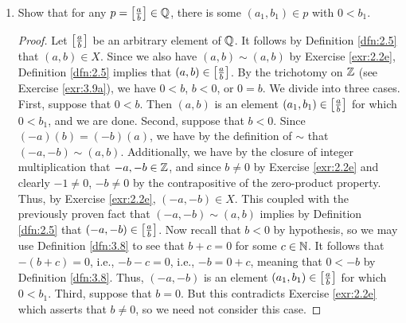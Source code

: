 \documentclass[../main.tex]{subfiles}
\begin{document}
\begin{exercise}
\begin{enumerate}[label={\alph*)},ref={\thetheorem\alph*}]
\begin{proof}
            To prove that $<$ is transitive, it will suffice to show that for all $x,y,z\in\Z$, if $x<y$ and $y<z$, then $x<z$. Let $x,y,z$ be arbitrary elements of $\Z$ for which it is true that $x<y$ and $y<z$. By Definition \ref{dfn:3.8}, we have $y=x+c$ and $z=y+c'$ for some $c,c'\in\N$. Substituting, we have $z=x+c+c'$. Since $(c+c')\in\N$ by the closure of addition on $\N$, Definition \ref{dfn:3.8} implies that $x<z$.\par\medskip
            Axiom \ref{axm:3.3} asserts that $\Z$ must have no first or last point. Suppose for the sake of contradiction that $\Z$ has some first point $a$. Then by Definition \ref{dfn:3.3}, $a\leq x$ for every $x\in\Z$. However, under the closure of subtraction on $\Z$, $(a-1)\in\Z$. Since $(a-1)+1=a$, Definition \ref{dfn:3.8} asserts that $a-1<a$, a contradiction. The proof is symmetric for the last point.
        \end{proof}
        \item \label{exr:3.9b}Show that for any $p=\left[ \frac{a}{b} \right]\in\mathbb{Q}$, there is some $(a_1,b_1)\in p$ with $0<b_1$.
        \begin{proof}
            Let $\left[ \frac{a}{b} \right]$ be an arbitrary element of $\mathbb{Q}$. It follows by Definition \ref{dfn:2.5} that $(a,b)\in X$. Since we also have $(a,b)\sim(a,b)$ by Exercise \ref{exr:2.2e}, Definition \ref{dfn:2.5} implies that $(a,b)\in\left[ \frac{a}{b} \right]$. By the trichotomy on $\Z$ (see Exercise \ref{exr:3.9a}), we have $0<b$, $b<0$, or $0=b$. We divide into three cases. First, suppose that $0<b$. Then $(a,b)$ is an element $(a_1,b_1)\in\left[ \frac{a}{b} \right]$ for which $0<b_1$, and we are done. Second, suppose that $b<0$. Since $(-a)(b)=(-b)(a)$, we have by the definition of $\sim$ that $(-a,-b)\sim(a,b)$. Additionally, we have by the closure of integer multiplication that $-a,-b\in\mathbb{Z}$, and since $b\neq 0$ by Exercise \ref{exr:2.2e} and clearly $-1\neq 0$, $-b\neq 0$ by the contrapositive of the zero-product property. Thus, by Exercise \ref{exr:2.2e}, $(-a,-b)\in X$. This coupled with the previously proven fact that $(-a,-b)\sim(a,b)$ implies by Definition \ref{dfn:2.5} that $(-a,-b)\in\left[ \frac{a}{b} \right]$. Now recall that $b<0$ by hypothesis, so we may use Definition \ref{dfn:3.8} to see that $b+c=0$ for some $c\in\mathbb{N}$. It follows that $-(b+c)=0$, i.e., $-b-c=0$, i.e., $-b=0+c$, meaning that $0<-b$ by Definition \ref{dfn:3.8}. Thus, $(-a,-b)$ is an element $(a_1,b_1)\in\left[ \frac{a}{b} \right]$ for which $0<b_1$. Third, suppose that $b=0$. But this contradicts Exercise \ref{exr:2.2e} which asserts that $b\neq 0$, so we need not consider this case.

\end{proof}
\end{enumerate}
\end{exercise}
\end{document}

